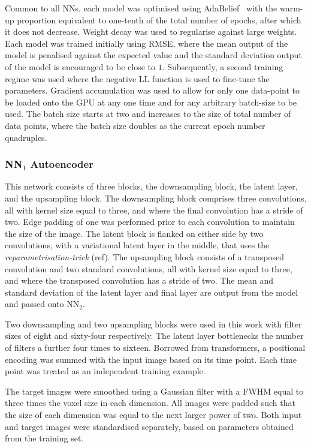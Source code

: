         Common to all \glspl{NN}, each model was optimised using AdaBelief~\cite{Zhuang2020AdaBeliefGradients} with the warm-up proportion equivalent to one-tenth of the total number of epochs, after which it does not decrease. Weight decay was used to regularise against large weights. Each model was trained initially using \gls{RMSE}, where the mean output of the model is penalised against the expected value and the standard deviation output of the model is encouraged to be close to $1$. Subsequently, a second training regime was used where the negative \gls{LL} function is used to fine-tune the parameters. Gradient accumulation was used to allow for only one data-point to be loaded onto the \gls{GPU} at any one time and for any arbitrary batch-size to be used. The batch size starts at two and increases to the size of total number of data points, where the batch size doubles as the current epoch number quadruples.

        \subsubsection{\gls{NN}$_1$ Autoencoder} \label{sec:NN1}
            This network consists of three blocks, the downsampling block, the latent layer, and the upsampling block. The downsampling block comprises three convolutions, all with kernel size equal to three, and where the final convolution has a stride of two. Edge padding of one was performed prior to each convolution to maintain the size of the image. The latent block is flanked on either side by two convolutions, with a variational latent layer in the middle, that uses the \textit{reparametrisation-trick} (ref). The upsampling block consists of a transposed convolution and two standard convolutions, all with kernel size equal to three, and where the transposed convolution has a stride of two. The mean and standard deviation of the latent layer and final layer are output from the model and passed onto \gls{NN}$_2$.

            Two downsampling and two upsampling blocks were used in this work with filter sizes of eight and sixty-four respectively. The latent layer bottlenecks the number of filters a further four times to sixteen. Borrowed from transformers, a positional encoding was summed with the input image based on its time point. Each time point was treated as an independent training example.

            The target images were smoothed using a Gaussian filter with a \gls{FWHM} equal to three times the voxel size in each dimension. All images were padded such that the size of each dimension was equal to the next larger power of two. Both input and target images were standardised separately, based on parameters obtained from the training set.

